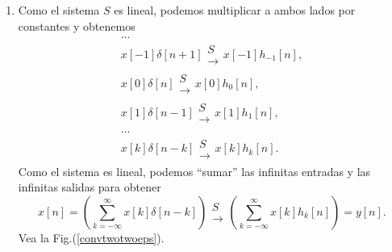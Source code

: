 \begin{enumerate}
\item Como el sistema $S$ es lineal, podemos multiplicar a ambos lados
  por constantes y obtenemos
  \begin{equation}
    \begin{array}{c}
      ... \\ 
      x\left[ -1\right] \delta \left[ n+1\right] 
      \begin{array}{c}
        S \\ 
        \rightarrow
      \end{array}
      x\left[ -1\right] h_{-1}\left[ n\right] , \\ 
      x\left[ 0\right] \delta \left[ n\right] 
      \begin{array}{c}
        S \\ 
        \rightarrow
      \end{array}
      x\left[ 0\right] h_{0}\left[ n\right] , \\ 
      x\left[ 1\right] \delta \left[ n-1\right] 
      \begin{array}{c}
        S \\ 
        \rightarrow
      \end{array}
      x\left[ 1\right] h_{1}\left[ n\right] , \\ 
      ... \\ 
      x\left[ k\right] \delta \left[ n-k\right] 
      \begin{array}{c}
        S \\ 
        \rightarrow
      \end{array}
      x\left[ k\right] h_{k}\left[ n\right] .
    \end{array}
  \end{equation}
  Como el sistema es lineal, podemos ``sumar'' las infinitas entradas
  y las infinitas salidas para obtener
  \begin{equation}
    x\left[ n\right] =\left( \sum_{k=-\infty }^{\infty }x\left[ k\right] \delta 
      \left[ n-k\right] \right) 
    \begin{array}{c}
      S \\ 
      \rightarrow
    \end{array}
    \left( \sum_{k=-\infty }^{\infty }x\left[ k\right] h_{k}\left[ n\right]
    \right) =y\left[ n\right] .     \label{convo}
  \end{equation}
  Vea la Fig.(\ref{convtwotwoeps}).


\end{enumerate}
